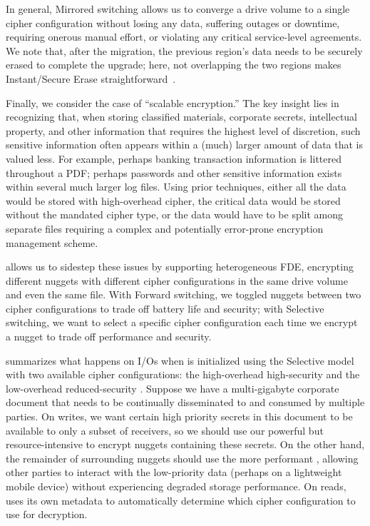 In general, Mirrored switching allows us to converge a drive volume to a single
cipher configuration without losing any data, suffering outages or downtime,
requiring onerous manual effort, or violating any critical service-level
agreements. We note that, after the migration, the previous region's data needs
to be securely erased to complete the upgrade; here, not overlapping the two
regions makes Instant/Secure Erase straightforward~\cite{ISE1,ISE2}.



 Finally, we consider the case of ``scalable
encryption.'' The key insight lies in recognizing that, when storing classified
materials, corporate secrets, intellectual property, and other information that
requires the highest level of discretion, such sensitive information often
appears within a (much) larger amount of data that is valued less. For example,
perhaps banking transaction information is littered throughout a PDF; perhaps
passwords and other sensitive information exists within several much larger log
files. Using prior techniques, either all the data would be stored with
high-overhead cipher, the critical data would be stored without the mandated
cipher type, or the data would have to be split among separate files requiring a
complex and potentially error-prone encryption management scheme.

\sys allows us to sidestep these issues by supporting heterogeneous FDE, \ie
encrypting different nuggets with different cipher configurations in the same
drive volume and even the same file. With Forward switching, we toggled nuggets
between two cipher configurations to trade off battery life and security; with
Selective switching, we want to select a specific cipher configuration each time
we encrypt a nugget to trade off performance and security.

 summarizes what happens on I/Os when \sys is initialized using
the Selective model with two available cipher configurations: the high-overhead
high-security \cone and the low-overhead reduced-security \ctwo. Suppose we have
a multi-gigabyte corporate document that needs to be continually disseminated to
and consumed by multiple parties. On writes, we want certain high priority
secrets in this document to be available to only a subset of receivers, so we
should use our powerful but resource-intensive \cone to encrypt nuggets
containing these secrets. On the other hand, the remainder of surrounding
nuggets should use the more performant \ctwo, allowing other parties to interact
with the low-priority data (perhaps on a lightweight mobile device) without
experiencing degraded storage performance. On reads, \sys uses its own metadata
to automatically determine which cipher configuration to use for decryption.
